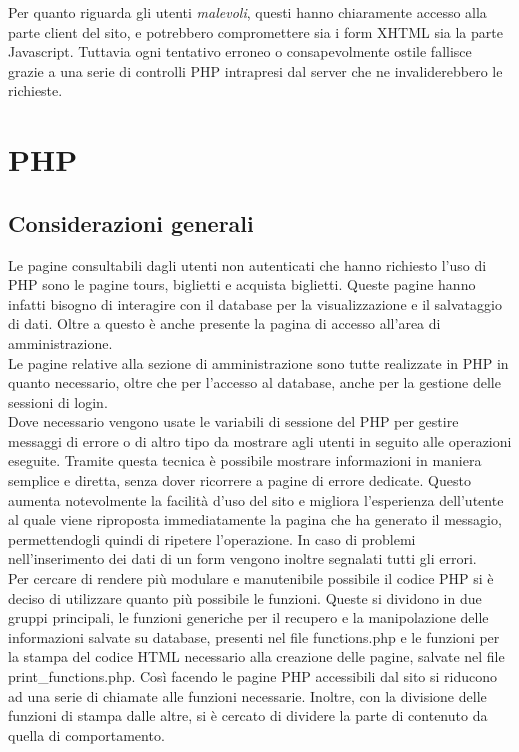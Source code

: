 \documentclass[10pt,a4paper,onecolumn]{article}
\begin{document}
Per quanto riguarda gli utenti \textit{malevoli}, questi hanno chiaramente accesso alla parte client del sito, e potrebbero compromettere sia i form XHTML sia la parte Javascript. Tuttavia ogni tentativo erroneo o consapevolmente ostile fallisce grazie a una serie di controlli PHP intrapresi dal server che ne invaliderebbero le richieste.

\clearpage
\section{PHP}
\subsection{Considerazioni generali}
Le pagine consultabili dagli utenti non autenticati che hanno richiesto l'uso di PHP sono le pagine tours, biglietti e acquista biglietti. Queste pagine hanno infatti bisogno di interagire con il database per la visualizzazione e il salvataggio di dati. Oltre a questo è anche presente la pagina di accesso all'area di amministrazione.\\
Le pagine relative alla sezione di amministrazione sono tutte realizzate in PHP in quanto necessario, oltre che per l'accesso al database, anche per la gestione delle sessioni di login.\\
Dove necessario vengono usate le variabili di sessione del PHP per gestire messaggi di errore o di altro tipo da mostrare agli utenti in seguito alle operazioni eseguite. Tramite questa tecnica è possibile mostrare informazioni in maniera semplice e diretta, senza dover ricorrere a pagine di errore dedicate. Questo aumenta notevolmente la facilità d'uso del sito e migliora l'esperienza dell'utente al quale viene riproposta immediatamente la pagina che ha generato il messagio, permettendogli quindi di ripetere l'operazione. In caso di problemi nell'inserimento dei dati di un form vengono inoltre segnalati tutti gli errori.\\
Per cercare di rendere più modulare e manutenibile possibile il codice PHP si è deciso di utilizzare quanto più possibile le funzioni. Queste si dividono in due gruppi principali, le funzioni generiche per il recupero e la manipolazione delle informazioni salvate su database, presenti nel file functions.php e le funzioni per la stampa del codice HTML necessario alla creazione delle pagine, salvate nel file print\_functions.php. Così facendo le pagine PHP accessibili dal sito si riducono ad una serie di chiamate alle funzioni necessarie. Inoltre, con la divisione delle funzioni di stampa dalle altre, si è cercato di dividere la parte di contenuto da quella di comportamento.\\
\end{document}
